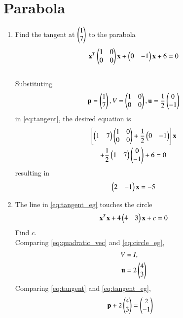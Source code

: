 \documentclass[journal,12pt,twocolumn]{IEEEtran}
\renewcommand\thesection{\arabic{section}}
\begin{document}
\section{Parabola}
\begin{enumerate}[label=\thesection.\arabic*
,ref=\thesection.\theenumi]
\item Find the tangent at $\begin{pmatrix}1 \\ 7\end{pmatrix}$ to the parabola
\begin{equation}
\mathbf{x}^T\begin{pmatrix}1 & 0 \\ 0 & 0\end{pmatrix}\mathbf{x} + \begin{pmatrix}0 & -1\end{pmatrix}\mathbf{x} + 
6 = 0
\end{equation}
\\
\solution Substituting
\begin{equation}
\mathbf{p} = \begin{pmatrix}1 \\ 7\end{pmatrix}, V = \begin{pmatrix}1 & 0 \\ 0 & 0\end{pmatrix}, \mathbf{u} = \frac{1}{2}\begin{pmatrix}0 \\ -1\end{pmatrix}
\end{equation}
%
in \eqref{eq:tangent}, the desired equation is
\begin{multline}
{}\left[\begin{pmatrix} 1 & 7\end{pmatrix}\begin{pmatrix}1 & 0 \\ 0 & 0\end{pmatrix}+\frac{1}{2}\begin{pmatrix}0 & -1\end{pmatrix}\right]\mathbf{x} 
\\
+ \frac{1}{2}\begin{pmatrix} 1 & 7\end{pmatrix}\begin{pmatrix}0 \\
-1\end{pmatrix} 
+6 = 0
\end{multline}
resulting in
\begin{equation}
\begin{pmatrix} 2 & -1\end{pmatrix}\mathbf{x} 
 = -5
\label{eq:tangent_eg}
\end{equation}
\item The line in \eqref{eq:tangent_eg}
touches the circle
\begin{equation}
\mathbf{x}^T\mathbf{x} + 4 \begin{pmatrix}4 & 3\end{pmatrix}\mathbf{x} + c = 0
\label{eq:circle_eg}
\end{equation}
Find $c$.
\\
\solution Comparing \eqref{eq:quadratic_vec} and \eqref{eq:circle_eg},
\begin{align}
\begin{split}
V &= I,
\\
\mathbf{u} &= 2 \begin{pmatrix}4 \\ 3\end{pmatrix}
\end{split}
\end{align}
%
Comparing \eqref{eq:tangent} and \eqref{eq:tangent_eg},
\begin{align}
\vec{p}+2 \myvec{4 \\ 3} &= \myvec{2 \\ -1}

\end{align}
\end{enumerate}
\end{document}
